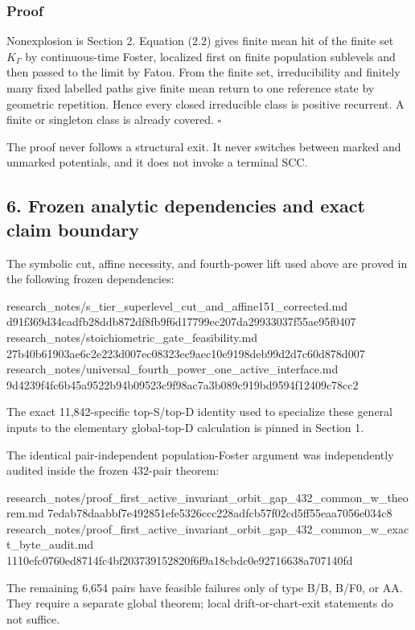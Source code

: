 \subsubsection{Proof}

Nonexplosion is Section 2. Equation (2.2) gives finite mean hit of the
finite set \(K_\Gamma\) by continuous-time Foster, localized first on
finite population sublevels and then passed to the limit by Fatou. From
the finite set, irreducibility and finitely many fixed labelled paths
give finite mean return to one reference state by geometric repetition.
Hence every closed irreducible class is positive recurrent. A finite or
singleton class is already covered. \(\square\)

The proof never follows a structural exit. It never switches between
marked and unmarked potentials, and it does not invoke a terminal SCC.

\subsection{6. Frozen analytic dependencies and exact claim
boundary}

The symbolic cut, affine necessity, and fourth-power lift used above are
proved in the following frozen dependencies:

\begin{CodeBlock}
research_notes/s_tier_superlevel_cut_and_affine151_corrected.md
d91f369d34cadfb28ddb872df8fb9f6d17799ec207da29933037f55ae95f0407
research_notes/stoichiometric_gate_feasibility.md
27b40b61903ae6c2e223d007ec08323ec9aec10e9198deb99d2d7c60d878d007
research_notes/universal_fourth_power_one_active_interface.md
9d4239f4fc6b45a9522b94b09523c9f98ac7a3b089c919bd9594f12409c78cc2
\end{CodeBlock}

The exact 11,842-specific top-S/top-D identity used to specialize these
general inputs to the elementary global-top-D calculation is pinned in
Section 1.

The identical pair-independent population-Foster argument was
independently audited inside the frozen 432-pair theorem:

\begin{CodeBlock}
research_notes/proof_first_active_invariant_orbit_gap_432_common_w_theorem.md
7edab78daabbf7e492851efe5326ccc228adfcb57f02cd5ff55eaa7056e034c8
research_notes/proof_first_active_invariant_orbit_gap_432_common_w_exact_byte_audit.md
1110efc0760ed8714fc4bf203739152820f6f9a18cbdc0e92716638a707140fd
\end{CodeBlock}

The remaining 6,654 pairs have feasible failures only of type B/B, B/F0,
or AA. They require a separate global theorem; local drift-or-chart-exit
statements do not suffice.
